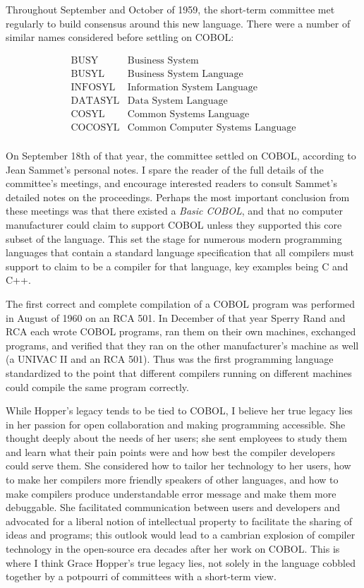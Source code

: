 Throughout September and October of 1959, the short-term committee met
regularly to build consensus around this new language.
There were a number of similar names considered before settling on COBOL:

\[
\begin{array}{ll}
\text{BUSY}   & \text{Business System} \\
\text{BUSYL}  & \text{Business System Language} \\
\text{INFOSYL} & \text{Information System Language} \\
\text{DATASYL} & \text{Data System Language} \\
\text{COSYL}  & \text{Common Systems Language} \\
\text{COCOSYL} & \text{Common Computer Systems Language} \\
\end{array}
\]

On September 18th of that year, the committee settled on
COBOL, according to Jean Sammet's personal notes\cite{sammet_early_history_of_cobol_1978}.
I spare the reader of the full details of the committee's meetings,
and encourage interested readers to consult Sammet's detailed notes on the proceedings.
Perhaps the most important conclusion from these meetings was that there existed a
\textit{Basic COBOL}, and that no computer manufacturer could claim to support COBOL
unless they supported this core subset of the language.
This set the stage for numerous modern programming languages that contain a
standard language specification that all compilers must support to claim to
be a compiler for that language, key examples being C and C++.

The first correct and complete compilation of a COBOL program was performed in
August of 1960 on an RCA 501.
In December of that year Sperry Rand and RCA each wrote COBOL programs,
ran them on their own machines, exchanged programs, and verified that they ran on
the other manufacturer's machine as well (a UNIVAC II and an RCA 501).
Thus was the first programming language standardized to the point that different compilers
running on different machines could compile the same program correctly.

While Hopper's legacy tends to be tied to COBOL, I believe her true legacy lies in
her passion for open collaboration and making programming accessible.
She thought deeply about the needs of her users; she sent employees to study them
and learn what their pain points were and how best the compiler developers could serve them.
She considered how to tailor her technology to her users, how to make her compilers
more friendly speakers of other languages, and how to make compilers produce understandable
error message and make them more debuggable.
She facilitated communication between users and developers and advocated for
a liberal notion of intellectual property to facilitate the sharing of ideas and programs;
this outlook would lead to a cambrian explosion of compiler technology in the open-source era
decades after her work on COBOL.
This is where I think Grace Hopper's true legacy lies, not solely in the language
cobbled together by a potpourri of committees with a short-term view.

